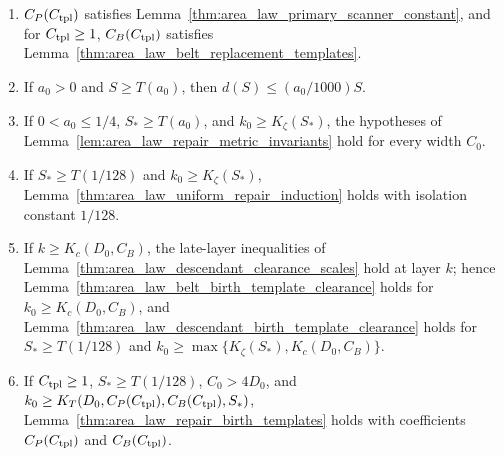 \begin{lemma}
    \label{thm:area_law_two_family_repair_thresholds}
    \leanok
    \begin{enumerate}
        \item $C_P(C_{\rm tpl})$ satisfies
              Lemma~\ref{thm:area_law_primary_scanner_constant}, and for
              $C_{\rm tpl}\ge1$, $C_B(C_{\rm tpl})$ satisfies
              Lemma~\ref{thm:area_law_belt_replacement_templates}.
        \item If $a_0>0$ and $S\ge T(a_0)$, then $d(S)\le(a_0/1000)S$.
        \item If $0<a_0\le1/4$, $S_*\ge T(a_0)$, and $k_0\ge K_\zeta(S_*)$,
              the hypotheses of
              Lemma~\ref{lem:area_law_repair_metric_invariants} hold for every
              width $C_0$.
        \item If $S_*\ge T(1/128)$ and $k_0\ge K_\zeta(S_*)$,
              Lemma~\ref{thm:area_law_uniform_repair_induction} holds with
              isolation constant $1/128$.
        \item If $k\ge K_c(D_0,C_B)$, the late-layer inequalities of
              Lemma~\ref{thm:area_law_descendant_clearance_scales} hold at
              layer $k$; hence
              Lemma~\ref{thm:area_law_belt_birth_template_clearance} holds
              for $k_0\ge K_c(D_0,C_B)$, and
              Lemma~\ref{thm:area_law_descendant_birth_template_clearance}
              holds for $S_*\ge T(1/128)$ and
              $k_0\ge\max\{K_\zeta(S_*),K_c(D_0,C_B)\}$.
        \item If $C_{\rm tpl}\ge1$, $S_*\ge T(1/128)$, $C_0>4D_0$, and
              $k_0\ge K_T(D_0,C_P(C_{\rm tpl}),C_B(C_{\rm tpl}),S_*)$,
              Lemma~\ref{thm:area_law_repair_birth_templates} holds with
              coefficients $C_P(C_{\rm tpl})$ and $C_B(C_{\rm tpl})$.
    \end{enumerate}
\end{lemma}

